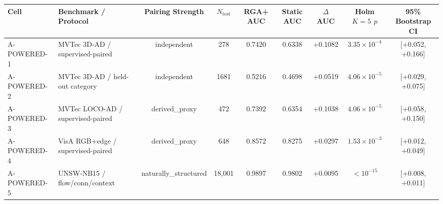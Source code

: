 \begin{tabular}{llccccccc}
\toprule
\textbf{Cell} & \textbf{Benchmark / Protocol} & \textbf{Pairing Strength} & \textbf{$N_{\text{test}}$} & \textbf{RGA+ AUC} & \textbf{Static AUC} & \textbf{$\Delta$ AUC} & \textbf{Holm $K=5$ $p$} & \textbf{95\% Bootstrap CI} \\
\midrule
A-POWERED-1 & MVTec 3D-AD / supervised-paired & independent & 278 & 0.7420 & 0.6338 & +0.1082 & $3.35\times 10^{-4}$ & [+0.052, +0.166] \\
A-POWERED-2 & MVTec 3D-AD / held-out category & independent & 1681 & 0.5216 & 0.4698 & +0.0519 & $4.06\times 10^{-5}$ & [+0.029, +0.075] \\
A-POWERED-3 & MVTec LOCO-AD / supervised-paired & derived\_proxy & 472 & 0.7392 & 0.6354 & +0.1038 & $4.06\times 10^{-5}$ & [+0.058, +0.150] \\
A-POWERED-4 & VisA RGB+edge / supervised-paired & derived\_proxy & 648 & 0.8572 & 0.8275 & +0.0297 & $1.53\times 10^{-3}$ & [+0.012, +0.049] \\
A-POWERED-5 & UNSW-NB15 / flow/conn/context & naturally\_structured & 18,001 & 0.9897 & 0.9802 & +0.0095 & $< 10^{-15}$ & [+0.008, +0.011] \\
\bottomrule
\end{tabular}
